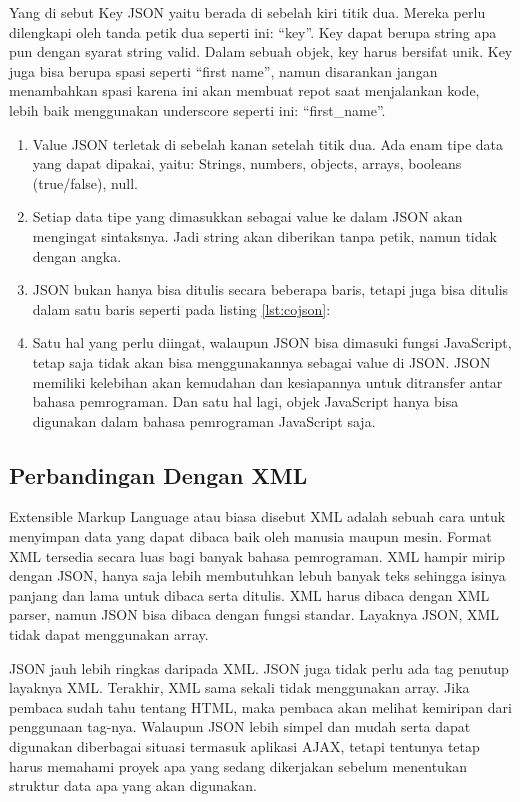 Yang di sebut Key JSON yaitu berada di sebelah kiri titik dua. Mereka perlu dilengkapi oleh tanda petik dua seperti ini: “key”. Key dapat berupa string apa pun dengan syarat string valid. Dalam sebuah objek, key harus bersifat unik. Key juga bisa berupa spasi seperti “first name”, namun disarankan jangan menambahkan spasi karena ini akan membuat repot saat menjalankan kode, lebih baik menggunakan underscore seperti ini: “first\_name”.
\begin{enumerate}
\item Value JSON terletak di sebelah kanan setelah titik dua. Ada enam tipe data yang dapat dipakai, yaitu: Strings, numbers, objects, arrays, booleans (true/false), null. 
\item Setiap data tipe yang dimasukkan sebagai value ke dalam JSON akan mengingat sintaksnya. Jadi string akan diberikan tanpa petik, namun tidak dengan angka.
\item JSON bukan hanya bisa ditulis secara beberapa baris, tetapi juga bisa ditulis dalam satu baris seperti pada listing \ref{lst:cojson}:


\item Satu hal yang perlu diingat, walaupun JSON bisa dimasuki fungsi JavaScript, tetap saja tidak akan bisa menggunakannya sebagai value di JSON. JSON memiliki kelebihan akan kemudahan dan kesiapannya untuk ditransfer antar bahasa pemrograman. Dan satu hal lagi, objek JavaScript hanya bisa digunakan dalam bahasa pemrograman JavaScript saja.
\end{enumerate}

\subsection{Perbandingan Dengan XML}
Extensible Markup Language atau biasa disebut XML adalah sebuah cara untuk menyimpan data yang dapat dibaca baik oleh manusia maupun mesin. Format XML tersedia secara luas bagi banyak bahasa pemrograman. XML hampir mirip dengan JSON, hanya saja lebih membutuhkan lebuh banyak teks sehingga isinya panjang dan lama untuk dibaca serta ditulis. XML harus dibaca dengan XML parser, namun JSON bisa dibaca dengan fungsi standar. Layaknya JSON, XML tidak dapat menggunakan array.

JSON jauh lebih ringkas daripada XML. JSON juga tidak perlu ada tag penutup layaknya XML. Terakhir, XML sama sekali tidak menggunakan array. Jika pembaca sudah tahu tentang HTML, maka pembaca akan melihat kemiripan dari penggunaan tag-nya. Walaupun JSON lebih simpel dan mudah serta dapat digunakan diberbagai situasi termasuk aplikasi AJAX, tetapi tentunya tetap harus memahami proyek apa yang sedang dikerjakan sebelum menentukan struktur data apa yang akan digunakan.

